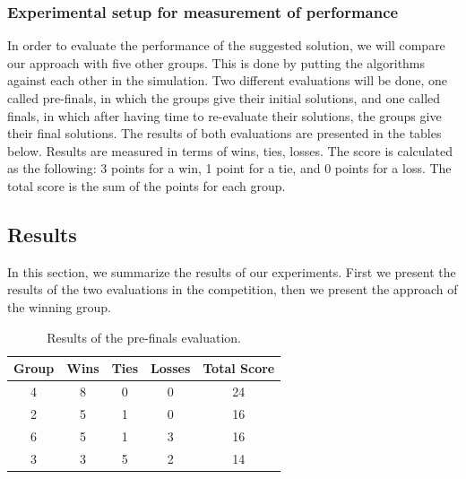 \documentclass[a4paper,12pt]{article}
\begin{document}
\subsubsection{Experimental setup for measurement of performance}
In order to evaluate the performance of the suggested solution, we will compare our approach with five other groups. 
This is done by putting the algorithms against each other in the simulation. 
Two different evaluations will be done, one called pre-finals, in which the groups give their initial solutions, and one called finals, in which after having time to re-evaluate their solutions, the groups give their final solutions.
The results of both evaluations are presented in the tables below.
Results are measured in terms of wins, ties, losses. The score is calculated as the following: 3 points for a win, 1 point for a tie, and 0 points for a loss. The total score is the sum of the points for each group.




\subsection{Results}
\label{subsec:results}
In this section, we summarize the results of our experiments. First we present the results of the two evaluations in the competition, then we present the approach of the winning group.


\begin{table}[!hptb]
  \centering
  \begin{tabular}{|c|c|c|c|c|}
    \hline
    \textbf{Group} & \textbf{Wins} & \textbf{Ties} & \textbf{Losses} & \textbf{Total Score} \\
    \hline
    4 & 8 & 0 & 0 & 24 \\
    \hline
    2 & 5 & 1 & 0 & 16 \\
    \hline
    6 & 5 & 1 & 3 & 16 \\
    \hline
    3 & 3 & 5 & 2 & 14 \\
    \hline
  \end{tabular}
  \caption{Results of the pre-finals evaluation.}
  \label{tab:results_prefinals}
\end{table}
\end{document}
